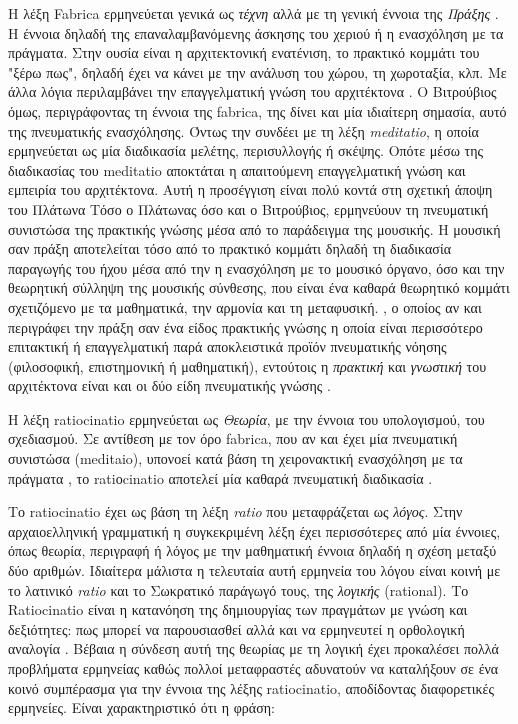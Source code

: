 \begin{description}[style=nextline]
\item[Fabrica]

Η λέξη Fabrica ερμηνεύεται γενικά ως \emph{τέχνη} αλλά με τη γενική έννοια της 
\emph{Πράξης} \cite{vitruvius-lefas,graham-education}. Η έννοια δηλαδή της 
επαναλαμβανόμενης άσκησης του χεριού ή η ενασχόληση με τα πράγματα. Στην ουσία 
είναι η αρχιτεκτονική ενατένιση, το πρακτικό κομμάτι του "ξέρω πως", δηλαδή 
έχει να κάνει με την ανάλυση του χώρου, τη χωροταξία, κλπ. Με άλλα λόγια 
περιλαμβάνει την επαγγελματική γνώση του αρχιτέκτονα \cite{graham-education}. Ο 
Βιτρούβιος όμως, περιγράφοντας τη έννοια της fabrica, της δίνει και μία 
ιδιαίτερη σημασία, αυτό της πνευματικής ενασχόλησης. Όντως την συνδέει με τη 
λέξη \emph{meditatio}, η οποία ερμηνεύεται ως μία διαδικασία μελέτης, 
περισυλλογής ή σκέψης. Οπότε μέσω της διαδικασίας του meditatio αποκτάται η 
απαιτούμενη επαγγελματική γνώση και εμπειρία του αρχιτέκτονα. Αυτή η προσέγγιση 
είναι πολύ κοντά στη σχετική άποψη του Πλάτωνα\sidenote%
{Τόσο ο Πλάτωνας όσο και ο Βιτρούβιος, ερμηνεύουν τη πνευματική συνιστώσα της 
πρακτικής γνώσης μέσα από το παράδειγμα της μουσικής. Η μουσική σαν πράξη 
αποτελείται τόσο από το πρακτικό κομμάτι δηλαδή τη διαδικασία παραγωγής του 
ήχου μέσα από την η ενασχόληση με το μουσικό όργανο, όσο και την θεωρητική 
σύλληψη της μουσικής σύνθεσης, που είναι ένα καθαρά θεωρητικό κομμάτι 
σχετιζόμενο με τα μαθηματικά, την αρμονία και τη μεταφυσική.}
, ο οποίος αν και περιγράφει την πράξη σαν ένα είδος πρακτικής γνώσης η οποία είναι περισσότερο επιτακτική ή επαγγελματική παρά αποκλειστικά προϊόν πνευματικής νόησης (φιλοσοφική, επιστημονική ή μαθηματική), εντούτοις η \emph{πρακτική} και \emph{γνωστική} του αρχιτέκτονα είναι και οι δύο είδη πνευματικής γνώσης \cite{graham-education}.  


\item[Ratiocinatio]

Η λέξη ratiocinatio ερμηνεύεται ως \emph{Θεωρία}, με την έννοια του υπολογισμού, του σχεδιασμού. Σε αντίθεση με τον όρο fabrica, που αν και έχει μία πνευματική συνιστώσα (meditaio), υπονοεί κατά βάση τη χειρονακτική ενασχόληση με τα πράγματα , το ratiοcinatio αποτελεί μία καθαρά πνευματική διαδικασία \cite{vitruvius-lefas}.

Το ratiocinatio έχει ως βάση τη λέξη \emph{ratio} που μεταφράζεται ως 
\emph{λόγος}. Στην αρχαιοελληνική γραμματική η συγκεκριμένη λέξη έχει 
περισσότερες από μία έννοιες, όπως θεωρία, περιγραφή ή λόγος με την μαθηματική 
έννοια δηλαδή η σχέση μεταξύ δύο αριθμών. Ιδιαίτερα μάλιστα η τελευταία αυτή 
ερμηνεία του λόγου είναι κοινή με το λατινικό \emph{ratio} και το Σωκρατικό 
παράγωγό τους, της \emph{λογικής} (rational). Το Ratiocinatio είναι η κατανόηση 
της δημιουργίας των πραγμάτων με γνώση και δεξιότητες: πως μπορεί να 
παρουσιασθεί αλλά και να ερμηνευτεί η ορθολογική αναλογία 
\cite{patterson-1997}.  Βέβαια η σύνδεση αυτή της θεωρίας με τη λογική έχει 
προκαλέσει πολλά προβλήματα ερμηνείας καθώς πολλοί μεταφραστές αδυνατούν να 
καταλήξουν σε ένα κοινό συμπέρασμα για την έννοια της λέξης ratiocinatio, 
αποδίδοντας διαφορετικές ερμηνείες. Είναι χαρακτηριστικό ότι η φράση:


\end{description}
